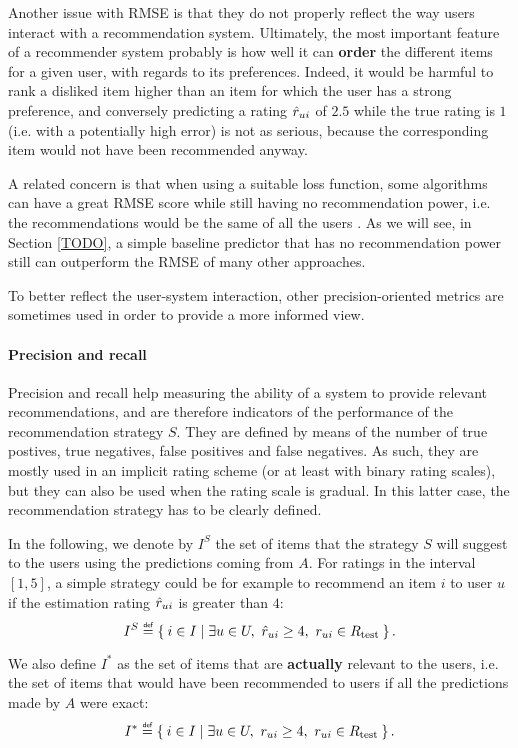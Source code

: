 Another issue with RMSE is that they do not properly reflect the way users
interact with a recommendation system.  Ultimately, the most important feature
of a recommender system probably is how well it can \textbf{order} the
different items for a given user, with regards to its preferences. Indeed, it
would be harmful to rank a disliked item higher than an item for which the user
has a strong preference, and conversely predicting a rating $\hat{r}_{ui}$ of $2.5$
while the true rating is $1$ (i.e. with a potentially high error) is not as
serious, because the corresponding item would not have been recommended anyway.

A related concern is that when using a suitable loss function, some algorithms
can have a great RMSE score while still having no recommendation power, i.e.
the recommendations would be the same of all the users \cite{KorSillRECSYS11}.
As we will see, in Section \ref{TODO}, a simple baseline predictor that has no
recommendation power still can outperform the RMSE of many other approaches.

To better reflect the user-system interaction, other precision-oriented metrics
are sometimes used in order to provide a more informed view.

\paragraph{Precision and recall\\}
Precision and recall help measuring the ability of a system to provide relevant
recommendations, and are therefore indicators of the performance of the
recommendation strategy $S$. They are defined by means of the number of true
postives, true negatives, false positives and false negatives. As such, they
are mostly used in an implicit rating scheme (or at least with binary rating
scales), but they can also be used when the rating scale is gradual. In this
latter case, the recommendation strategy has to be clearly defined.

In the following, we denote by $I^S$ the set of items that the strategy $S$
will suggest to the users using the predictions coming from $A$. For
ratings in the interval $[1, 5]$, a simple strategy could be for example to
recommend an item $i$ to user $u$ if the estimation rating $\hat{r}_{ui}$ is
greater than $4$:
$$I^S \eqdef \Set{i \in I | \exists u \in U, ~\predrui \geq 4,~ \rui \in \Rtest}.$$

We also define $I^*$ as the set of items that are \textbf{actually} relevant to
the users, i.e.  the set of items that would have been recommended to users if
all the predictions made by $A$ were exact:
$$I^* \eqdef \Set{i \in I | \exists u \in U, ~\rui \geq 4,~ \rui \in \Rtest}.$$

